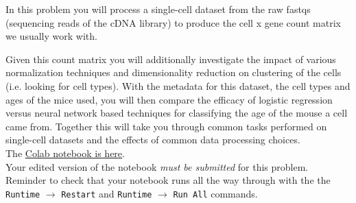 \documentclass[11pt]{exam}
\begin{document}
\begin{questions}
\question[100]

In this problem you will process a single-cell dataset from the raw fastqs (sequencing reads of the cDNA library) to produce the cell x gene count matrix we usually work with. 

Given this count matrix you will additionally investigate the impact of various normalization techniques and dimensionality reduction on clustering of the cells (i.e. looking for cell types). With the metadata for this dataset, the cell types and ages of the mice used, you will then compare the efficacy of logistic regression versus neural network based techniques for classifying the age of the mouse a cell came from. Together this will take you through common tasks performed on single-cell datasets and the effects of common data processing choices. \\

The \href{https://github.com/pachterlab/BI-BE-CS-183-2023/blob/main/HW10/HW10Final.ipynb}{Colab notebook is here}. \\

Your edited version of the notebook \textit{must be submitted } for this problem. Reminder to check that your notebook runs all the way through with the the {\tt Runtime} $\xrightarrow{}$ {\tt Restart} and {\tt Runtime} $\xrightarrow{}$ {\tt Run All} commands.


\end{questions}
\end{document}
